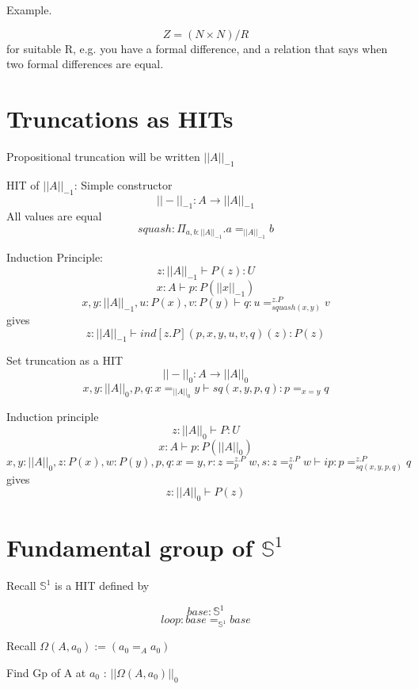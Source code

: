 \documentclass[11pt]{article}
\renewcommand{\SS}{\mathbb{S}}
\begin{document}
Example.

$$Z = (N \times N) / R$$
for suitable R, e.g. you have a formal difference, and a relation that says when two formal differences are equal.

\section{Truncations as HITs}
\newcommand{\ntrunc}[2]{||#1||_{#2}}
\newcommand{\propt}[1]{\ntrunc{#1}{-1}}
Propositional truncation will be written $\propt{A}$

HIT of $\propt{A}$:
Simple constructor
$$\propt{-} : A \rightarrow \propt{A}$$
All values are equal
$$squash : \Pi_{a, b : \propt{A}} . a =_{\propt{A}} b$$

Induction Principle:
$$z : \propt{A} \vdash P(z) : U$$
$$x : A \vdash p : P(\propt{x})$$
$$x, y : \propt{A}, u : P(x), v : P(y) \vdash q : u =_{squash(x, y)}^{z.P} v$$
gives
$$z : \propt{A} \vdash ind[z.P](p, x, y, u, v, q)(z) : P(z)$$

Set truncation as a HIT
\newcommand{\sett}[1]{\ntrunc{#1}{0}}
$$\sett{-} : A \rightarrow \sett{A}$$
$$x, y : \sett{A}, p, q : x =_{\sett{A}} y \vdash sq(x, y, p, q) : p =_{x = y} q$$

Induction principle
$$z : \sett{A} \vdash P : U$$
$$x : A \vdash p : P(\sett{A})$$
$$x, y : \sett{A}, z : P(x), w : P(y), p, q : x = y, r : z=_p^{z.P} w, s : z =_q^{z.P} w \vdash ip : p =_{sq(x,y,p,q)}^{z.P} q$$
gives
$$z : \sett{A} \vdash P(z)$$

\section{Fundamental group of $\SS^1$}
Recall $\SS^1$ is a HIT defined by

$$base : \SS^1$$
$$loop : base =_{\SS^1} base$$

Recall $\Omega(A, a_0) := (a_0 =_A a_0)$

Find Gp of A at $a_0$ : $\sett{\Omega(A, a_0)}$
\end{document}
